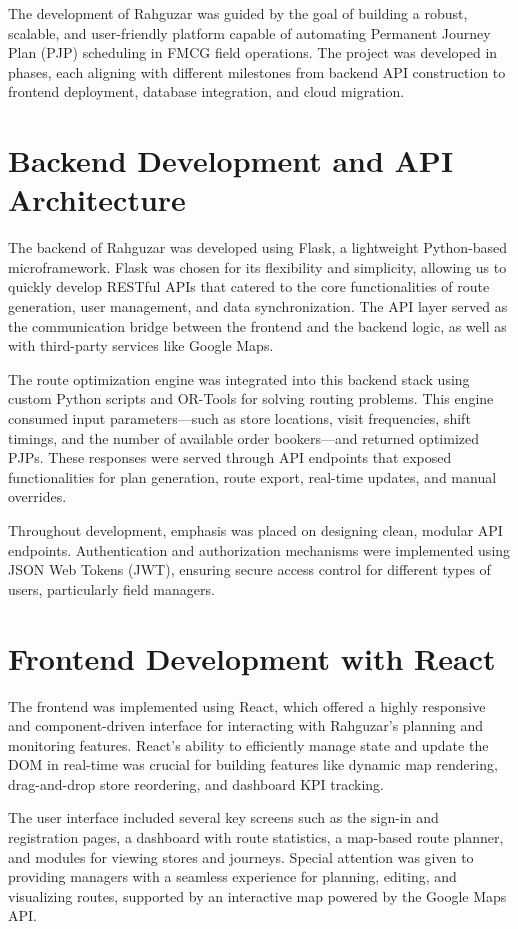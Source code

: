 The development of Rahguzar was guided by the goal of building a robust, scalable, and user-friendly platform capable of automating Permanent Journey Plan (PJP) scheduling in FMCG field operations. The project was developed in phases, each aligning with different milestones from backend API construction to frontend deployment, database integration, and cloud migration.

\section{Backend Development and API Architecture}
The backend of Rahguzar was developed using Flask, a lightweight Python-based microframework. Flask was chosen for its flexibility and simplicity, allowing us to quickly develop RESTful APIs that catered to the core functionalities of route generation, user management, and data synchronization. The API layer served as the communication bridge between the frontend and the backend logic, as well as with third-party services like Google Maps.

The route optimization engine was integrated into this backend stack using custom Python scripts and OR-Tools for solving routing problems. This engine consumed input parameters—such as store locations, visit frequencies, shift timings, and the number of available order bookers—and returned optimized PJPs. These responses were served through API endpoints that exposed functionalities for plan generation, route export, real-time updates, and manual overrides.

Throughout development, emphasis was placed on designing clean, modular API endpoints. Authentication and authorization mechanisms were implemented using JSON Web Tokens (JWT), ensuring secure access control for different types of users, particularly field managers.

\section{Frontend Development with React}
The frontend was implemented using React, which offered a highly responsive and component-driven interface for interacting with Rahguzar's planning and monitoring features. React’s ability to efficiently manage state and update the DOM in real-time was crucial for building features like dynamic map rendering, drag-and-drop store reordering, and dashboard KPI tracking.

The user interface included several key screens such as the sign-in and registration pages, a dashboard with route statistics, a map-based route planner, and modules for viewing stores and journeys. Special attention was given to providing managers with a seamless experience for planning, editing, and visualizing routes, supported by an interactive map powered by the Google Maps API.

